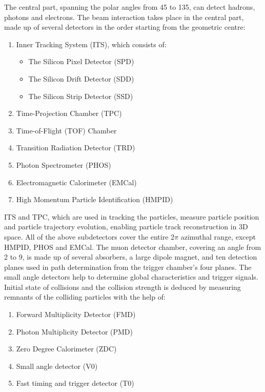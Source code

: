 The central part, spanning the polar angles from 45\degree{} to 135\degree{}, can detect hadrons, photons and electrons. The beam interaction takes place
in the central part, made up of several detectors in the order starting from the geometric centre:
\begin{enumerate}
    \item Inner Tracking System (ITS), which consists of$\colon$
          \begin{itemize}
              \item The Silicon Pixel Detector (SPD)
              \item The Silicon Drift Detector (SDD)
              \item The Silicon Strip Detector (SSD)
          \end{itemize}
    \item Time-Projection Chamber (TPC)
    \item Time-of-Flight (TOF) Chamber
    \item Transition Radiation Detector (TRD)
    \item Photon Spectrometer (PHOS)
    \item Electromagnetic Calorimeter (EMCal)
    \item High Momentum Particle Identification (HMPID)
\end{enumerate}

ITS and TPC, which are used in tracking the particles, measure particle position and particle trajectory evolution, enabling particle track reconstruction
in 3D space. All of the above subdetectors cover the entire 2$\pi$ azimuthal range, except HMPID, PHOS and EMCal.
The muon detector chamber, covering an angle from 2\degree{} to 9\degree{}, is made up of several absorbers, a large dipole magnet, and ten detection planes
used in path determination from the trigger chamber's four planes. The small angle detectors help to determine global characteristics and trigger signals.
Initial state of collisions and the collision strength is deduced by measuring remnants of the colliding particles with the help of$\colon$
\begin{enumerate}
    \item Forward Multiplicity Detector (FMD)
    \item Photon Multiplicity Detector (PMD)
    \item Zero Degree Calorimeter (ZDC)
    \item Small angle detector (V0)
    \item Fast timing and trigger detector (T0)
\end{enumerate}

